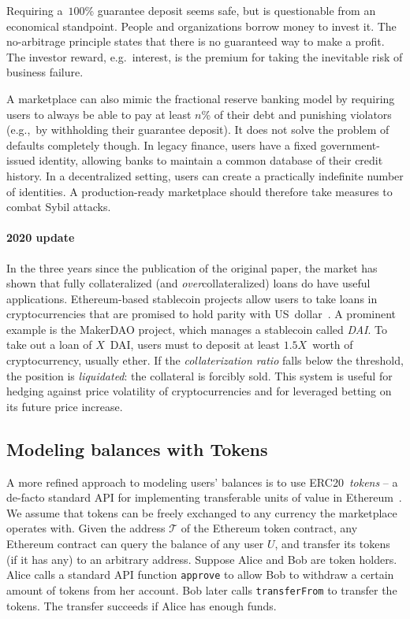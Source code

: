 Requiring a~$100$\% guarantee deposit seems safe, but is questionable from an economical standpoint.
People and organizations borrow money to invest it.
The no-arbitrage principle states that there is no guaranteed way to make a profit.
The investor reward, e.g.~interest, is the premium for taking the inevitable risk of business failure.

A marketplace can also mimic the fractional reserve banking model by requiring users to always be able to pay at least $n$\% of their debt and punishing violators (e.g.,~by withholding their guarantee deposit).
It does not solve the problem of defaults completely though.
In legacy finance, users have a fixed government-issued identity, allowing banks to maintain a common database of their credit history.
In a decentralized setting, users can create a practically indefinite number of identities.
A production-ready marketplace should therefore take measures to combat Sybil attacks.

\paragraph{2020 update}
In the three years since the publication of the original paper, the market has shown that fully collateralized (and \textit{over}collateralized) loans do have useful applications.
Ethereum-based stablecoin projects allow users to take loans in cryptocurrencies that are promised to hold parity with US~dollar~\cite{Mita2019}.
A prominent example is the MakerDAO project, which manages a stablecoin called \textit{DAI}.
To take out a loan of $X$~DAI, users must to deposit at least $1.5X$~worth of cryptocurrency, usually ether.
If the \textit{collaterization ratio} falls below the threshold, the position is \textit{liquidated}: the collateral is forcibly sold.
This system is useful for hedging against price volatility of cryptocurrencies and for leveraged betting on its future price increase.


\subsection{Modeling balances with Tokens}

A more refined approach to modeling users' balances is to use ERC20~\textit{tokens} -- a de-facto standard API for implementing transferable units of value in Ethereum~\cite{Victor2019}.
We assume that tokens can be freely exchanged to any currency the marketplace operates with.
Given the address $\mathcal{T}$ of the Ethereum token contract, any Ethereum contract can query the balance of any user $U$, and transfer its tokens (if it has any) to an arbitrary address.
Suppose Alice and Bob are token holders.
Alice calls a standard API function \texttt{approve} to allow Bob to withdraw a certain amount of tokens from her account.
Bob later calls \texttt{transferFrom} to transfer the tokens.
The transfer succeeds if Alice has enough funds.

